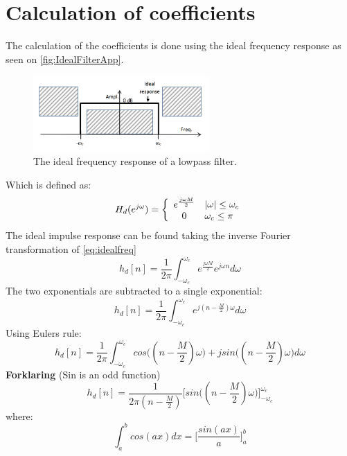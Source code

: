\section{Calculation of coefficients}
The calculation of the coefficients is done using the ideal frequency response as seen on \autoref{fig:IdealFilterApp}.
\begin{figure}[H]
\centering
\includegraphics[width=0.6\textwidth]{figures/Ideal_filter.png}
\caption{The ideal frequency response of a lowpass filter.}
\label{fig:IdealFilterApp}
\end{figure}
Which is defined as:
\begin{equation} \label{eq:idealfreq}
H_d(e^{j\omega})=\left\{
\begin{array}{c l}      
    e^{\frac{j\omega M}{2}} & |\omega|\leq\omega_c\\
    0 & \omega_c\leq\pi
\end{array}\right.
\end{equation}
The ideal impulse response can be found taking the inverse Fourier transformation of \autoref{eq:idealfreq}
\begin{equation}
h_d[n]=\frac{1}{2\pi}\int_{-\omega_c}^{\omega_c}e^{\frac{j\omega M}{2}} e^{j\omega n} d\omega
\end{equation}
The two exponentials are subtracted to a single exponential:
\begin{equation}
h_d[n]=\frac{1}{2\pi}\int_{-\omega_c}^{\omega_c}e^{j(n-\frac{M}{2})\omega} d\omega
\end{equation}
Using Eulers rule:
\begin{equation}
h_d[n]=\frac{1}{2\pi}\int_{-\omega_c}^{\omega_c}cos\Big((n-\frac{M}{2})\omega\Big)+jsin\Big((n-\frac{M}{2})\omega\Big) d\omega
\end{equation}
\textbf{Forklaring} (Sin is an odd function)
\begin{equation}
h_d[n]=\frac{1}{2\pi(n-\frac{M}{2})}\bigg[sin\Big((n-\frac{M}{2})\omega\Big)\bigg]_{-\omega_{c}}^{\omega_{c}}
\end{equation}
where:
\begin{equation}
\int_{a}^{b}cos(ax) dx = \Big[\frac{sin(ax)}{a}\Big]_{a}^{b}
\end{equation}
